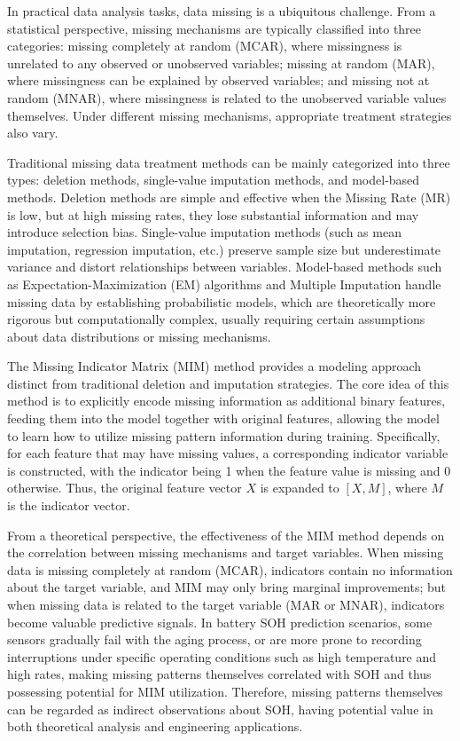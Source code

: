 \documentclass[5p,times]{elsarticle}
\begin{document}
In practical data analysis tasks, data missing is a ubiquitous challenge. From a statistical perspective, missing mechanisms are typically classified into three categories: missing completely at random (MCAR), where missingness is unrelated to any observed or unobserved variables; missing at random (MAR), where missingness can be explained by observed variables; and missing not at random (MNAR), where missingness is related to the unobserved variable values themselves\cite{little2002statistical,rubin1976inference}. Under different missing mechanisms, appropriate treatment strategies also vary.

Traditional missing data treatment methods can be mainly categorized into three types: deletion methods, single-value imputation methods, and model-based methods. Deletion methods are simple and effective when the Missing Rate (MR) is low, but at high missing rates, they lose substantial information and may introduce selection bias. Single-value imputation methods (such as mean imputation, regression imputation, etc.) preserve sample size but underestimate variance and distort relationships between variables. Model-based methods such as Expectation-Maximization (EM) algorithms and Multiple Imputation handle missing data by establishing probabilistic models, which are theoretically more rigorous but computationally complex, usually requiring certain assumptions about data distributions or missing mechanisms.

The Missing Indicator Matrix (MIM) method provides a modeling approach distinct from traditional deletion and imputation strategies\cite{jones1996indicator,van2023missing}. The core idea of this method is to explicitly encode missing information as additional binary features, feeding them into the model together with original features, allowing the model to learn how to utilize missing pattern information during training\cite{ipsen2022deal}. Specifically, for each feature that may have missing values, a corresponding indicator variable is constructed, with the indicator being 1 when the feature value is missing and 0 otherwise. Thus, the original feature vector $X$ is expanded to $[X, M]$, where $M$ is the indicator vector.

From a theoretical perspective, the effectiveness of the MIM method depends on the correlation between missing mechanisms and target variables. When missing data is missing completely at random (MCAR), indicators contain no information about the target variable, and MIM may only bring marginal improvements; but when missing data is related to the target variable (MAR or MNAR), indicators become valuable predictive signals. In battery SOH prediction scenarios, some sensors gradually fail with the aging process, or are more prone to recording interruptions under specific operating conditions such as high temperature and high rates, making missing patterns themselves correlated with SOH and thus possessing potential for MIM utilization. Therefore, missing patterns themselves can be regarded as indirect observations about SOH, having potential value in both theoretical analysis and engineering applications.
\end{document}
